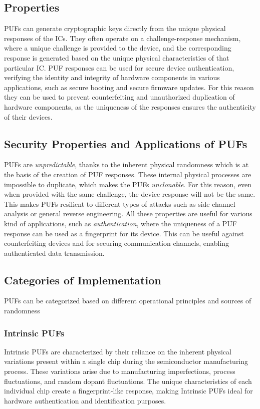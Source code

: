 \subsection{Properties} 
PUFs can generate cryptographic keys directly from the unique physical responses of the ICs.
They often operate on a challenge-response mechanism, where a unique challenge is provided to the device, and the corresponding response is generated based on the unique physical characteristics of that particular IC.
PUF responses can be used for secure device authentication, verifying the identity and integrity of hardware components in various applications, such as secure booting and secure firmware updates.
For this reason they can be used to prevent counterfeiting and unauthorized duplication of hardware components, as the uniqueness of the responses ensures the authenticity of their devices.

\subsection{Security Properties and Applications of PUFs}

PUFs are \textit{unpredictable}, thanks to the inherent physical randomness which is at the basis of the creation of PUF responses.
These internal physical processes are impossible to duplicate, which makes the PUFs \textit{unclonable}.
For this reason, even when provided with the same challenge, the device response will not be the same.
This makes PUFs resilient to different types of attacks such as side channel analysis or general reverse engineering.
All these properties are useful for various kind of applications, such as \textit{authentication}, where the uniqueness of a PUF response can be used as a fingerprint for its device.
This can be useful against counterfeiting devices and for securing communication channels, enabling authenticated data transmission.

\subsection{Categories of Implementation}
PUFs can be categorized based on different operational principles and sources of randomness
\subsubsection{Intrinsic PUFs}
Intrinsic PUFs are characterized by their reliance on the inherent physical variations present within a single chip during the semiconductor manufacturing process.
These variations arise due to manufacturing imperfections, process fluctuations, and random dopant fluctuations.
The unique characteristics of each individual chip create a fingerprint-like response, making Intrinsic PUFs ideal for hardware authentication and identification purposes.

